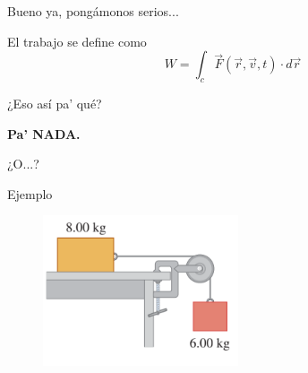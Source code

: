 \begin{frame}
\begin{center}
    Bueno ya, pongámonos serios...

    \vspace{4em}
    \pause El trabajo se define como \begin{equation*}
        W=\int_c\vec{F}(\vec{r},\vec{v},t)\cdot d\vec{r}
    \end{equation*}


\pause ¿Eso así pa' qué?

\vspace{2em}

\pause     \Huge \textbf{Pa' NADA.}
\end{center}
    
\end{frame}

\begin{frame}
    \begin{center}
        \Huge ¿O...?
    \end{center}
\end{frame}

\begin{frame}{Ejemplo}
    \begin{figure}
        \centering
        \includegraphics[width=0.4\linewidth]{figures/ejmeplo-trabajo1.png}
    \end{figure}
\end{frame}

